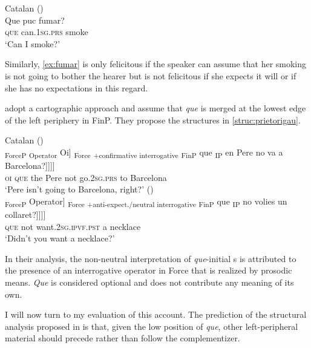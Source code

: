 \ea\label{ex:fumar} Catalan (\citealt[4: ex 9a]{PrietoRigau2007})\\
	\gll Que puc fumar?\\
	\textsc{que} can.\textsc{1sg.prs} smoke\\
	\glt `Can I smoke?'
\z

Similarly, \eqref{ex:fumar} is only felicitous if the speaker can assume that her smoking is not going to bother the hearer but is not felicitous if she expects it will or if she 
has no expectations in this regard.

\citet{PrietoRigau2007} adopt a cartographic approach and  assume that \textit{que} is merged at the lowest edge of the left periphery in {FinP}.   They propose the structures in \eqref{struc:prietorigau}.\largerpage

\ea Catalan\label{struc:prietorigau} 
\ea (\citealt[25: ex 56a]{PrietoRigau2007})\label{struc:prietorigaua}\\
\gll {\ob}\textsubscript{ForceP} {\ob}\textsubscript{Operator} Oi] {\ob}\textsubscript{Force} \textsubscript{+confirmative interrogative} {\ob}\textsubscript{FinP} que {\ob}\textsubscript{IP} en Pere no va a Barcelona?]]]]\\
{} {}  \textsc{oi} {} {} {}  \textsc{que} {} the Pere not go.\textsc{2sg.prs} to Barcelona\\
\glt `Pere isn't going to Barcelona, right?' 
\ex\label{struc:prietorigaub}(\citealt[25: ex 56b]{PrietoRigau2007})\\
\gll {\ob}\textsubscript{ForceP} {\ob}Operator] {\ob}\textsubscript{Force} \textsubscript{+anti-expect./neutral interrogative} {\ob}\textsubscript{FinP} que {\ob}\textsubscript{IP} no volies un collaret?]]]]\\
{} {}  {} {} {} \textsc{que} {} not want.\textsc{2sg.ipvf.pst} a necklace\\
\glt `Didn't you want a necklace?'
\z
\z

In their analysis, the non-neutral interpretation of \textit{que}-initial s is attributed to the presence of an interrogative operator in Force that is realized by  prosodic means. \textit{Que} is considered optional and does not contribute  any meaning of its own. 

 I will now turn to my evaluation of   this account. The prediction of the structural analysis proposed in \citet{PrietoRigau2007} is that, given the low position of \emph{que}, other left-peripheral material should precede rather than follow the complementizer. 


